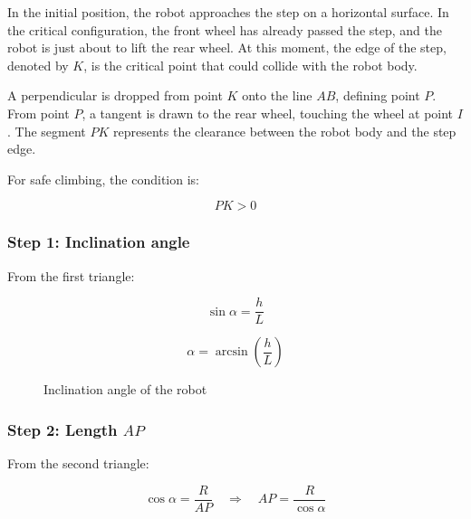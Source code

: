 \documentclass{article}
\begin{document}
\FloatBarrier
In the initial position, the robot approaches the step on a horizontal surface.  
In the critical configuration, the front wheel has already passed the step, and the robot is just about to lift the rear wheel.  
At this moment, the edge of the step, denoted by \(K\), is the critical point that could collide with the robot body.

A perpendicular is dropped from point \(K\) onto the line \(AB\), defining point \(P\).
From point \(P\), a tangent is drawn to the rear wheel, touching the wheel at point \(I\).
The segment \(PK\) represents the clearance between the robot body and the step edge.


For safe climbing, the condition is:

\[
\boxed{PK > 0}
\]

\subsubsection{Step 1: Inclination angle}


From the first triangle:

\[
\sin\alpha = \frac{h}{L}
\]

\[
\alpha = \arcsin\left(\frac{h}{L}\right)
\]

\begin{figure}[htbp]
\centering
{}
\caption{Inclination angle of the robot}
\end{figure}

\FloatBarrier
\subsubsection{Step 2: Length \(AP\)}

From the second triangle:

\[
\cos\alpha = \frac{R}{AP}
\quad \Rightarrow \quad
AP = \frac{R}{\cos\alpha}
\]
\end{document}
